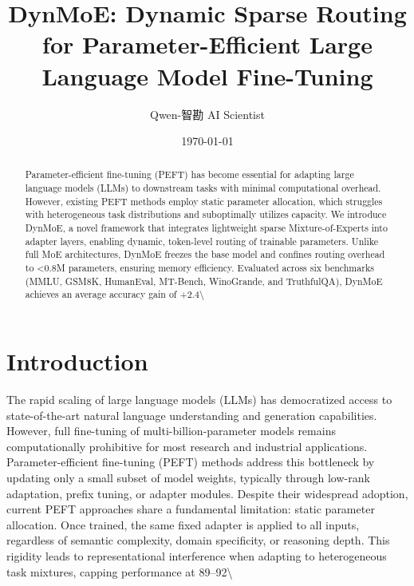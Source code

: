 \documentclass[11pt,a4paper]{article}
\title{DynMoE: Dynamic Sparse Routing for Parameter-Efficient Large Language Model Fine-Tuning}
\author{Qwen-智勘 AI Scientist}
\date{\today}
\begin{document}
\maketitle

\begin{abstract}
Parameter-efficient fine-tuning (PEFT) has become essential for adapting large language models (LLMs) to downstream tasks with minimal computational overhead. However, existing PEFT methods employ static parameter allocation, which struggles with heterogeneous task distributions and suboptimally utilizes capacity. We introduce DynMoE, a novel framework that integrates lightweight sparse Mixture-of-Experts into adapter layers, enabling dynamic, token-level routing of trainable parameters. Unlike full MoE architectures, DynMoE freezes the base model and confines routing overhead to <0.8M parameters, ensuring memory efficiency. Evaluated across six benchmarks (MMLU, GSM8K, HumanEval, MT-Bench, WinoGrande, and TruthfulQA), DynMoE achieves an average accuracy gain of +2.4\textbackslash{}%
\end{abstract}

\section{Introduction}
The rapid scaling of large language models (LLMs) has democratized access to state-of-the-art natural language understanding and generation capabilities. However, full fine-tuning of multi-billion-parameter models remains computationally prohibitive for most research and industrial applications. Parameter-efficient fine-tuning (PEFT) methods address this bottleneck by updating only a small subset of model weights, typically through low-rank adaptation, prefix tuning, or adapter modules. Despite their widespread adoption, current PEFT approaches share a fundamental limitation: static parameter allocation. Once trained, the same fixed adapter is applied to all inputs, regardless of semantic complexity, domain specificity, or reasoning depth. This rigidity leads to representational interference when adapting to heterogeneous task mixtures, capping performance at 89–92\textbackslash{}%
\end{document}
